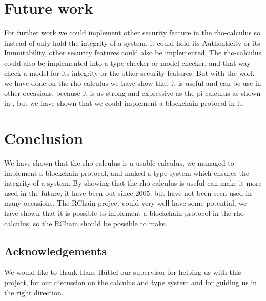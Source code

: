 \section{Future work}
For further work we could implement other security feature in the rho-calculus so instead of only hold the integrity of a system, it could hold its Authenticity or its Immutability, other security features could also be implemented. The rho-calculus could also be implemented into a type checker or model checker, and that way check a model for its integrity or the other security features. But with the work we have done on the rho-calculus we have show that it is useful and can be use in other occasions, because it is as strong and expressive as the pi calculus as shown in \citep{Meredith2005}, but we have shown that we could implement a blockchain protocol in it.



\section{Conclusion}
We have shown that the rho-calculus is a usable calculus, we managed to implement a blockchain protocol, and maked a type system which ensures the integrity of a system. By showing that the rho-calculus is useful can make it more used in the future, it have been out since 2005, but have not been seen used in many occasions. The RChain project could very well have some potential, we have shown that it is possible to implement a blockchain protocol in the rho-calculus, so the RChain should be possible to make.

\subsection*{Acknowledgements}
We would like to thank Hans Hüttel our supervisor for helping us with this project, for our discussion on the calculus and type system and for guiding us in the right direction.